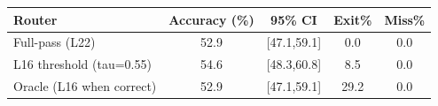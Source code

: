\begin{tabular}{lcccc}\toprule
Router & Accuracy (\%) & 95\% CI & Exit\% & Miss\%\\
\midrule
Full-pass (L22) & 52.9 & [47.1,59.1] & 0.0 & 0.0\\
L16 threshold (tau=0.55) & 54.6 & [48.3,60.8] & 8.5 & 0.0\\
Oracle (L16 when correct) & 52.9 & [47.1,59.1] & 29.2 & 0.0\\
\bottomrule\end{tabular}
